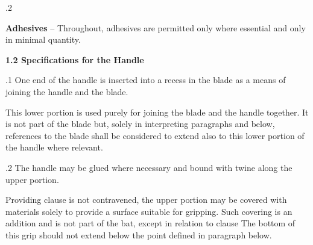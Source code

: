 \documentclass[12pt]{article}
\begin{document}
\vspace{\baselineskip}
{\fontsize{9pt}{10.8pt}.2 \tabto{0.49in} {\fontsize{8pt}{9.6pt}\selectfont \textbf{Adhesives }–\textbf{ }Throughout, adhesives are permitted only where essential and only in minimal quantity.\par}\par}\par


\vspace{\baselineskip}
{\fontsize{11pt}{13.2pt}\selectfont \textbf{1.2 \tabto{0.47in} Specifications for the Handle}\par}\par


\vspace{\baselineskip}
{\fontsize{9pt}{10.8pt}.1 \tabto{0.49in} One end of the handle is inserted into a recess in the blade as a means of joining the handle and the blade.\par}\par


\vspace{\baselineskip}
\begin{adjustwidth}{0.5in}{0.04in}
{\fontsize{9pt}{10.8pt}\selectfont This lower portion is used purely for joining the blade and the handle together. It is not part of the blade but, solely in interpreting paragraphs and below, references to the blade shall be considered to extend also to this lower portion of the handle where relevant.\par}\par

\end{adjustwidth}


\vspace{\baselineskip}
{\fontsize{9pt}{10.8pt}.2 \tabto{0.49in} The handle may be glued where necessary and bound with twine along the upper portion.\par}\par


\vspace{\baselineskip}
\begin{adjustwidth}{0.5in}{0.04in}
{\fontsize{9pt}{10.8pt}\selectfont Providing clause is not contravened, the upper portion may be covered with materials solely to provide a surface suitable for gripping. Such covering is an addition and is not part of the bat, except in relation to clause The bottom of this grip should not extend below the point defined in paragraph below.\par}\par

\end{adjustwidth}
\end{document}
